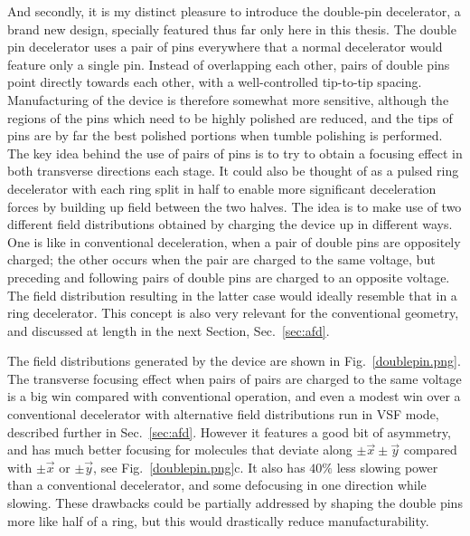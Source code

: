 And secondly, it is my distinct pleasure to introduce the double-pin decelerator, a brand new design, specially featured thus far only here in this thesis.
The double pin decelerator uses a pair of pins everywhere that a normal decelerator would feature only a single pin.
Instead of overlapping each other, pairs of double pins point directly towards each other, with a well-controlled tip-to-tip spacing.
Manufacturing of the device is therefore somewhat more sensitive, although the regions of the pins which need to be highly polished are reduced, and the tips of pins are by far the best polished portions when tumble polishing is performed.
The key idea behind the use of pairs of pins is to try to obtain a focusing effect in both transverse directions each stage.
It could also be thought of as a pulsed ring decelerator with each ring split in half to enable more significant deceleration forces by building up field between the two halves.
The idea is to make use of two different field distributions obtained by charging the device up in different ways.
One is like in conventional deceleration, when a pair of double pins are oppositely charged; the other occurs when the pair are charged to the same voltage, but preceding and following pairs of double pins are charged to an opposite voltage.
The field distribution resulting in the latter case would ideally resemble that in a ring decelerator. 
This concept is also very relevant for the conventional geometry, and discussed at length in the next Section, Sec.~\ref{sec:afd}.


The field distributions generated by the device are shown in Fig.~\ref{doublepin.png}.
The transverse focusing effect when pairs of pairs are charged to the same voltage is a big win compared with conventional operation, and even a modest win over a conventional decelerator with alternative field distributions run in VSF mode, described further in Sec.~\ref{sec:afd}.
However it features a good bit of asymmetry, and has much better focusing for molecules that deviate along $\pm\vec{x}\pm\vec{y}$ compared with $\pm\vec{x}$ or $\pm\vec{y}$, see Fig.~\ref{doublepin.png}c.
It also has $40\%$ less slowing power than a conventional decelerator, and some defocusing in one direction while slowing.
These drawbacks could be partially addressed by shaping the double pins more like half of a ring, but this would drastically reduce manufacturability.

